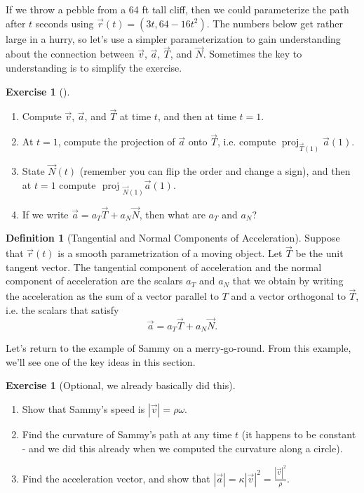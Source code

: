\documentclass[10pt,]{book}
\theoremstyle{plain}
\theoremstyle{definition}
\newtheorem{definition}[theorem]{Definition}
\theoremstyle{definition}
\theoremstyle{definition}
\theoremstyle{definition}
\newtheorem{exploration}[project]{Exercise}
\theoremstyle{definition}
\numberwithin{equation}{section}
\newcommand{\ds}{\displaystyle}
\DeclareMathOperator{\proj}{proj}
\begin{document}
If we throw a pebble from a 64 ft tall cliff, then we could parameterize the path after \(t\) seconds using \(\vec r(t) = (3t,64-16t^2)\). The numbers below get rather large in a hurry, so let's use a simpler parameterization to gain understanding about the connection between \(\vec v\), \(\vec a\), \(\vec T\), and \(\vec N\). Sometimes the key to understanding is to simplify the exercise.%
\begin{exploration}[]\label{exploration-181}
\leavevmode%
\begin{enumerate}[font=\bfseries,label=(\alph*),ref=\alph*]
\item\label{task-446} Compute \(\vec v\), \(\vec a\), and \(\vec T\) at time \(t\), and then at time \(t=1\).%
\item\label{task-447} At \(t=1\), compute the projection of \(\vec a\) onto \(\vec T\), i.e. compute \(\proj_{\vec T(1)}\vec a(1)\).%
\item\label{task-448} State \(\vec N(t)\) (remember you can flip the order and change a sign), and then at \(t=1\) compute \(\text{ proj } _{\vec N(1)}\vec a(1)\).%
\item\label{task-449} If we write \(\vec a = a_T\vec T +a_N\vec N\), then what are \(a_T\) and \(a_N\)?%
\end{enumerate}
\end{exploration}
\begin{definition}[{Tangential and Normal Components of Acceleration}]\label{definition-30}
Suppose that \(\vec r(t)\) is a smooth parametrization of a moving object. Let \(\vec T\) be the unit tangent vector. The tangential component of acceleration and the normal component of acceleration are the scalars \(a_T\) and \(a_N\) that we obtain by writing the acceleration as the sum of a vector parallel to \(T\) and a vector orthogonal to \(\vec T\), i.e. the scalars that satisfy%
\begin{equation*}
\vec a = a_T\vec T+a_N\vec N.
\end{equation*}
%
\end{definition}
Let's return to the example of Sammy on a merry-go-round. From this example, we'll see one of the key ideas in this section.%
\begin{exploration}[Optional, we already basically did this]\label{exploration-182}
\leavevmode%
\begin{enumerate}[font=\bfseries,label=(\alph*),ref=\alph*]
\item\label{task-450} Show that Sammy's speed is \(|\vec v|=\rho \omega\).%
\item\label{task-451} Find the curvature of Sammy's path at any time \(t\) (it happens to be constant - and we did this already when we computed the curvature along a circle).%
\item\label{task-452} Find the acceleration vector, and show that \(\ds |\vec a| = \kappa |\vec v|^2 = \frac{|\vec v|^2}{\rho}\).%
\end{enumerate}
\end{exploration}
\end{document}
